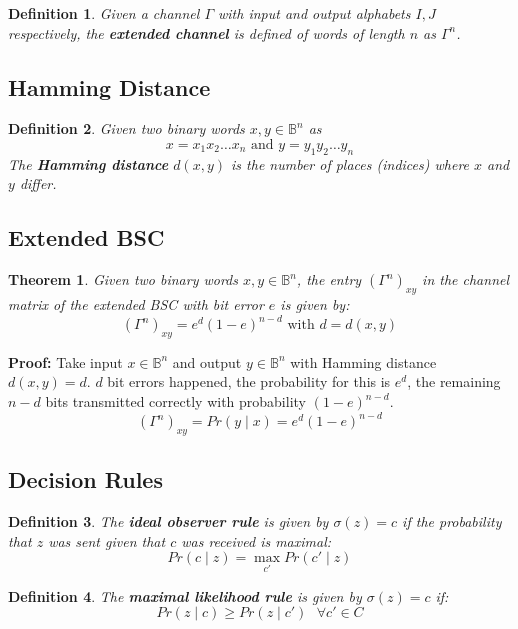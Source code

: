 \documentclass[11pt]{article}
\newtheorem{defn}{Definition}
\newtheorem{theo}{Theorem}
\begin{document}
\begin{defn}
  Given a channel $\Gamma$ with input and output alphabets $I, J$ respectively, the \textbf{extended channel} is defined of words of length $n$ as $\Gamma^n$.
\end{defn}

\subsection{Hamming Distance}
\begin{defn}
  Given two binary words $x, y \in \mathbb{B}^n$ as
  \[
    x = x_1 x_2 \ldots x_n \text{ and } y = y_1 y_2 \ldots y_n
  \]
  The \textbf{Hamming distance} $d(x, y)$ is the number of places (indices) where $x$ and $y$ differ.
\end{defn}

\subsection{Extended BSC}
\begin{theo}
  Given two binary words $x, y \in \mathbb{B}^n$, the entry $(\Gamma^n)_{xy}$ in the channel matrix of the extended BSC with bit error $e$ is given by:
  \[
    (\Gamma^n)_{xy} = e^d (1 - e)^{n - d} \text{ with } d = d(x, y)
  \]
\end{theo}

\textbf{Proof:}
Take input $x \in \mathbb{B}^n$ and output $y \in \mathbb{B}^n$ with Hamming distance $d(x, y) = d$.
$d$ bit errors happened, the probability for this is $e^d$, the remaining $n - d$ bits transmitted correctly with probability $(1 - e)^{n - d}$.
\[
  (\Gamma^n)_{xy} = Pr(y \mid x) = e^d (1 - e)^{n - d}
\]

\subsection{Decision Rules}
\begin{defn}
  The \textbf{ideal observer rule} is given by $\sigma (z) = c$ if the probability that $z$ was sent given that $c$ was received is maximal:
  \[
    Pr(c \mid z) = \max_{c'} Pr(c' \mid z)
  \]
\end{defn}

\begin{defn}
  The \textbf{maximal likelihood rule} is given by $\sigma (z) = c$ if:
  \[
    Pr(z \mid c) \geq Pr(z \mid c') \text{ } \forall c' \in C
  \]
\end{defn}
\end{document}
